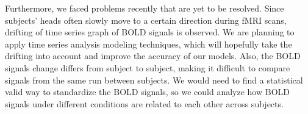 \documentclass[11pt,twocolumn]{article}
\begin{document}
Furthermore, we faced problems recently that are yet to be resolved. Since 
subjects' heads often slowly move to a certain direction during fMRI scans, 
drifting of time series graph of BOLD signals is observed. We are planning 
to apply time series analysis modeling techniques, which will hopefully take 
the drifting into account and improve the accuracy of our models. Also, the 
BOLD signals change differs from subject to subject, making it difficult to 
compare signals from the same run between subjects. We would need to 
find a statistical valid way to standardize the BOLD signals, so we could 
analyze how BOLD signals under different conditions are related to each 
other across subjects. \\






\end{document}
